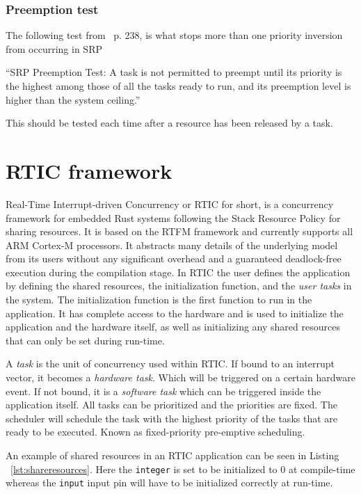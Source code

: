 \subsubsection{Preemption test}
The following test from~\cite{hardrealtimecomputingsystems} p. 238, is what
stops more than one priority inversion from occurring in SRP
\begin{displayquote}
    “SRP Preemption Test: A task is not permitted to preempt until its priority
    is the highest among those of all the tasks ready to run, and its preemption
    level is higher than the system ceiling.”
\end{displayquote}
This should be tested each time after a resource has been released by a task.


\section{RTIC framework}
Real-Time Interrupt-driven Concurrency or RTIC for short, is a concurrency
framework for embedded Rust systems following the Stack Resource Policy for
sharing resources. It is based on the RTFM framework\cite{rtfm} and currently
supports all ARM Cortex-M processors. It abstracts many details of the underlying
model from its users without any significant overhead and a guaranteed
deadlock-free execution during the compilation stage. In RTIC the user defines
the application by defining the shared resources, the initialization function,
and the \emph{user tasks} in the system. The initialization function is the
first function to run in the application. It has complete access to the
hardware and is used to initialize the application and the hardware itself, as
well as initializing any shared resources that can only be set during run-time.

A \emph{task} is the unit of concurrency used within RTIC\@. If bound to an
interrupt vector, it becomes a \emph{hardware task}. Which will be
triggered on a certain hardware event. If not bound, it is a \emph{software
task} which can be triggered inside the application itself. All tasks can
be prioritized and the priorities are fixed. The scheduler will schedule the
task with the highest priority of the tasks that are ready to be executed.
Known as fixed-priority pre-emptive scheduling\cite{fixedpriorityhistory}.

An example of shared resources in an RTIC application can be seen in Listing
~\ref{lst:shareresources}. Here the \texttt{integer} is set to be initialized to
$0$ at compile-time whereas the \texttt{input} input pin will have to be initialized
correctly at run-time.


